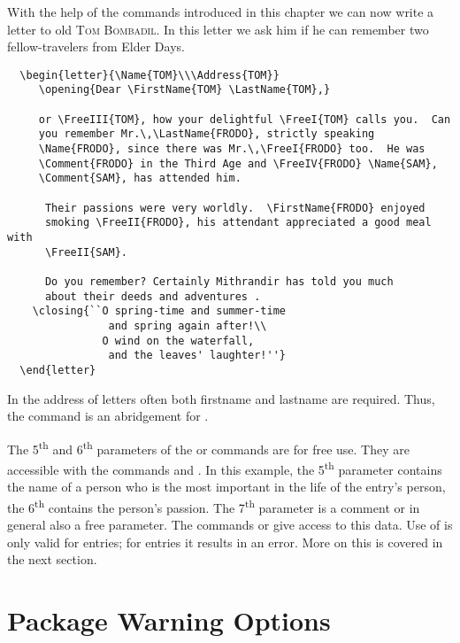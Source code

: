 With the help of the commands introduced in this chapter we can now
write a letter to old \textsc{Tom Bombadil}.  In this letter we ask
him if he can remember two fellow-travelers from Elder Days.
\begin{lstlisting}
  \begin{letter}{\Name{TOM}\\\Address{TOM}}
     \opening{Dear \FirstName{TOM} \LastName{TOM},}
     
     or \FreeIII{TOM}, how your delightful \FreeI{TOM} calls you.  Can
     you remember Mr.\,\LastName{FRODO}, strictly speaking
     \Name{FRODO}, since there was Mr.\,\FreeI{FRODO} too.  He was
     \Comment{FRODO} in the Third Age and \FreeIV{FRODO} \Name{SAM},
     \Comment{SAM}, has attended him.
      
      Their passions were very worldly.  \FirstName{FRODO} enjoyed
      smoking \FreeII{FRODO}, his attendant appreciated a good meal with
      \FreeII{SAM}.

      Do you remember? Certainly Mithrandir has told you much
      about their deeds and adventures .
    \closing{``O spring-time and summer-time
                and spring again after!\\
               O wind on the waterfall,
                and the leaves' laughter!''}
  \end{letter}
\end{lstlisting}
In the address of letters often both firstname and lastname are
required.  Thus, the command  is an
abridgement for 
.

The 5\textsuperscript{th} and 6\textsuperscript{th} parameters of the
 or  commands are for free use.  They
are accessible with the commands  and .  In
this example, the 5\textsuperscript{th} parameter contains the name of
a person who is the most important in the life of the entry's person,
the 6\textsuperscript{th} contains the person's passion.  The
7\textsuperscript{th} parameter is a comment or in general also a free
parameter. The commands  or  give access
to this data. Use of  is only valid for
 entries; for  entries it results in
an error. More on this is covered in the next section.

\section{Package Warning Options}

